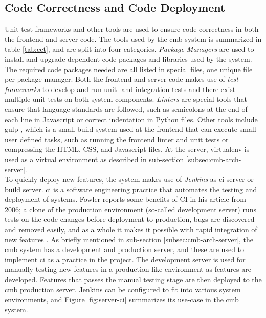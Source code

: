 \subsection{Code Correctness and Code Deployment}
Unit test frameworks and other tools are used to ensure code correctness in both the frontend and server code. The tools used by the \gls{cmb} system is summarized in table \ref{tab:cct}, and are split into four categories. \textit{Package Managers} are used to install and upgrade dependent code packages and libraries used by the system. The required code packages needed are all listed in special files, one unique file per package manager. Both the frontend and server code makes use of \textit{test frameworks} to develop and run unit- and integration tests and there exist multiple unit tests on both system components. \textit{Linters} are special tools that ensure that language standards are followed, such as semicolons at the end of each line in Javascript or correct indentation in Python files. Other tools include gulp \cite{GULP}, which is a small build system used at the frontend that can execute small user defined tasks, such as running the frontend linter and unit tests or compressing the HTML, CSS, and Javascript files. At the server, virtualenv \cite{VIRTUALENV} is used as a virtual environment as described in sub-section \ref{subsec:cmb-arch-server}. \\

To quickly deploy new features, the system makes use of \textit{Jenkins} \cite{JENKINS} as \gls{ci} server or build server. \gls{ci} is a software engineering practice that automates the testing and deployment of systems. Fowler reports some benefits of CI in his article from 2006; a clone of the production environment (so-called development server) runs tests on the code changes before deployment to production, bugs are discovered and removed easily, and as a whole it makes it possible with rapid integration of new features \cite{a:F:CI}. As briefly mentioned in sub-section \ref{subsec:cmb-arch-server}, the \gls{cmb} system has a development and production server, and these are used to implement \gls{ci} as a practice in the project. The development server is used for manually testing new features in a production-like environment as features are developed. Features that passes the manual testing stage are then deployed to the \gls{cmb} production server. Jenkins can be configured to fit into various system environments, and Figure \ref{fig:server-ci} summarizes its use-case in the \gls{cmb} system. \\

